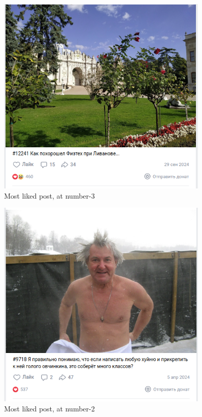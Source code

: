 \documentclass[
	12pt
] {article}
\begin{document}
	\newpage	
	\vspace*{\fill}
	\begin{figure}[H]
		\centering
		\includegraphics[width=0.9\textwidth]{fig-top-posts-3}
		\caption{Most liked post, at number-3}
		\label{fig-top-posts-3}
	\end{figure}
	\vfill
	
	\newpage		
	\vspace*{\fill}
	\begin{figure}[H]
		\centering
		\includegraphics[width=0.9\textwidth]{fig-top-posts-2}
		\caption{Most liked post, at number-2}
		\label{fig-top-posts-2}
	\end{figure}
	\vfill
	
\end{document}
